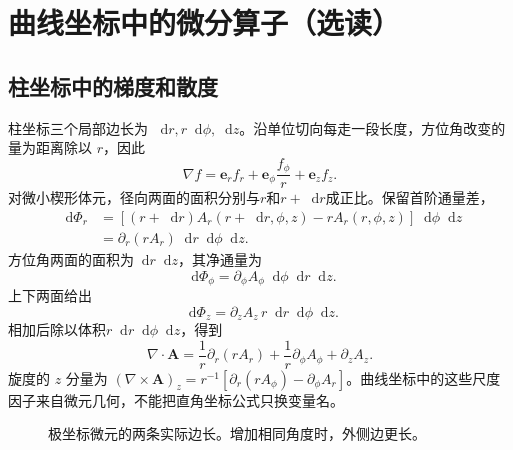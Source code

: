 \documentclass[11pt,openany,fontset=fandol]{ctexbook}
\theoremstyle{plain}\newtheorem{theorem}{定理}[chapter]\newtheorem{proposition}[theorem]{命题}
\theoremstyle{definition}\newtheorem{definition}{定义}[chapter]\newtheorem{example}{例}[chapter]
\theoremstyle{remark}\newtheorem*{remark}{说明}
\newcommand{\dd}{\mathop{}\!\mathrm d}\newcommand{\ii}{\mathrm i}\newcommand{\ee}{\mathrm e}
\newcommand{\vct}[1]{\bm{#1}}\newcommand{\Rea}{\operatorname{Re}}\newcommand{\Ima}{\operatorname{Im}}
\begin{document}
\section{曲线坐标中的微分算子（选读）}
\subsection{柱坐标中的梯度和散度}
柱坐标三个局部边长为 $\dd r,r\dd\phi,\dd z$。沿单位切向每走一段长度，方位角改变的量为距离除以 $r$，因此
\[
\nabla f=\vct e_r f_r+\vct e_\phi\frac{f_\phi}{r}+\vct e_z f_z.
\]
对微小楔形体元，径向两面的面积分别与$r$和$r+\dd r$成正比。保留首阶通量差，
\[
\begin{aligned}
\dd\Phi_r
&=[(r+\dd r)A_r(r+\dd r,\phi,z)-rA_r(r,\phi,z)]\dd\phi\dd z\\
&=\partial_r(rA_r)\dd r\dd\phi\dd z.
\end{aligned}
\]
方位角两面的面积为$\dd r\dd z$，其净通量为
\[
\dd\Phi_\phi=\partial_\phi A_\phi\dd\phi\dd r\dd z.
\]
上下两面给出
\[
\dd\Phi_z=\partial_zA_z\,r\dd r\dd\phi\dd z.
\]
相加后除以体积$r\dd r\dd\phi\dd z$，得到
\[
\nabla\cdot\vct A=\frac1r\partial_r(rA_r)+\frac1r\partial_\phi A_\phi+\partial_zA_z.
\]
旋度的 $z$ 分量为 $(\nabla\times\vct A)_z=r^{-1}[\partial_r(rA_\phi)-\partial_\phi A_r]$。曲线坐标中的这些尺度因子来自微元几何，不能把直角坐标公式只换变量名。
\begin{figure}[htbp]\centering
{}
\caption{极坐标微元的两条实际边长。增加相同角度时，外侧边更长。}
\label{fig:orig-041}
\end{figure}
\end{document}

